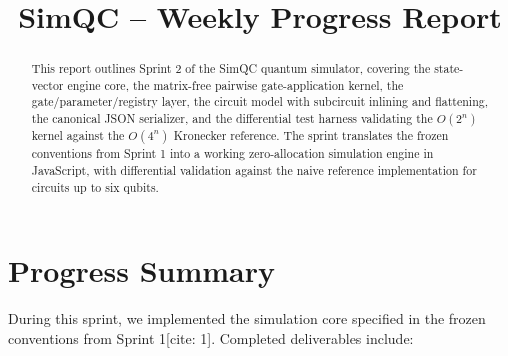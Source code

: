 \documentclass[conference]{IEEEtran}
\begin{document}
\title{SimQC -- Weekly Progress Report\\}
\author{
}

\maketitle

\begin{abstract}
This report outlines Sprint 2 of the SimQC quantum simulator, covering the state-vector engine core, the matrix-free pairwise gate-application kernel, the gate/parameter/registry layer, the circuit model with subcircuit inlining and flattening, the canonical JSON serializer, and the differential test harness validating the $O(2^n)$ kernel against the $O(4^n)$ Kronecker reference. The sprint translates the frozen conventions from Sprint 1 into a working zero-allocation simulation engine in JavaScript, with differential validation against the naive reference implementation for circuits up to six qubits.
\end{abstract}

\section{Progress Summary}
During this sprint, we implemented the simulation core specified in the frozen conventions from Sprint 1[cite: 1]. Completed deliverables include:
\end{document}
